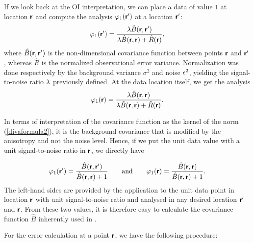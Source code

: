 If we look back at the OI interpretation, we can place a data of value $1$ at location $\vect{r}$ and compute the analysis $\varphi_1(\vect{r}^\prime)$ at a location $\vect{r}^\prime$:
\begin{equation}
\varphi_1(\vect{r}^\prime) = {\snr \hat{B} (\vect{r},\vect{r}^\prime)\over  \snr \hat{B}(\vect{r},\vect{r}) + \hat{R}(\vect{r}) },
\end{equation}
where $\hat{B}(\vect{r},\vect{r}^\prime)$ is the non-dimensional covariance function between points $\vect{r}$ and $\vect{r}^\prime$, whereas $\hat{R}$ is the normalized observational error variance. Normalization was done respectively by the background variance $\sigma^2$ and noise $\noise^2$, yielding the signal-to-noise ratio $\snr$ previously defined. 
At the data location itself, we get the analysis
\begin{equation}
\varphi_1(\vect{r}) = {\snr \hat{B} (\vect{r},\vect{r}) \over \snr \hat{B}(\vect{r},\vect{r}) + \hat{R}(\vect{r}) }.
\end{equation}

In terms of interpretation of the covariance function as the kernel of the norm (\eqref{divaformula2}), it is the background covariance that is modified by the anisotropy and not the noise level. Hence, if we put the unit data value with a unit signal-to-noise ratio in $\vect{r}$, we directly have

\begin{equation}
\varphi_1(\vect{r}^\prime) = { \hat{B} (\vect{r},\vect{r}^\prime)\over   \hat{B}(\vect{r},\vect{r}) + 1 } \qquad \textrm{and} \qquad 
\varphi_1(\vect{r}) = { \hat{B} (\vect{r},\vect{r}) \over  \hat{B}(\vect{r},\vect{r}) + 1 }.
\end{equation}
The left-hand sides are provided by the \diva application to the unit data point in location $\vect{r}$ with unit signal-to-noise ratio and analysed in any desired location $\vect{r}^\prime$ and $\vect{r}$. From these two values, it is therefore easy to calculate the covariance function $\hat{B}$ inherently used in \diva.

For the error calculation at a point $\vect{r}$, we have the following procedure: 

